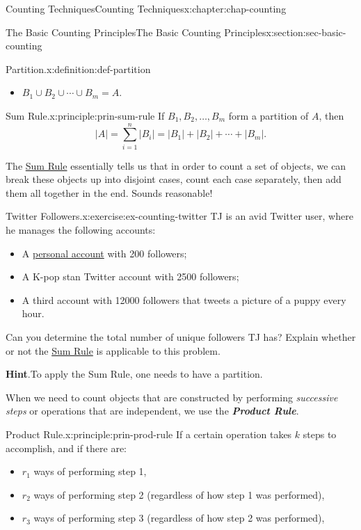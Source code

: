 \documentclass[oneside,10pt,]{book}
\newcommand{\blocktitlefont}{\relax}
\newcommand{\alert}[1]{\textbf{\textit{#1}}}
\numberwithin{equation}{section}
\begin{document}
\begin{chapterptx}{Counting Techniques}{}{Counting Techniques}{}{}{x:chapter:chap-counting}
\begin{sectionptx}{The Basic Counting Principles}{}{The Basic Counting Principles}{}{}{x:section:sec-basic-counting}
\begin{definition}{Partition.}{x:definition:def-partition}
\begin{itemize}[label=\textbullet]
\item{}\(B_1 \cup B_2 \cup \cdots \cup B_m = A\).%
\end{itemize}
%
\end{definition}
\begin{principle}{Sum Rule.}{}{x:principle:prin-sum-rule}%
If \(B_1,B_2,\ldots,B_m\) form a partition of \(A\), then%
\begin{equation*}
|A| = \sum_{i=1}^n |B_i| = |B_1| + |B_2| + \cdots + |B_m|\text{.}
\end{equation*}
%
\end{principle}
The \hyperref[x:principle:prin-sum-rule]{Sum Rule} essentially tells us that in order to count a set of objects, we can break these objects up into disjoint cases, count each case separately, then add them all together in the end. Sounds reasonable!%
\begin{inlineexercise}{Twitter Followers.}{x:exercise:ex-counting-twitter}%
TJ is an avid Twitter user, where he manages the following accounts:%
\begin{itemize}[label=\textbullet]
\item{}A \href{https://twitter.com/tjyusun}{personal account} with 200 followers;%
\item{}A K-pop stan Twitter account with 2500 followers;%
\item{}A third account with 12000 followers that tweets a picture of a puppy every hour.%
\end{itemize}
Can you determine the total number of unique followers TJ has? Explain whether or not the \hyperref[x:principle:prin-sum-rule]{Sum Rule} is applicable to this problem.%
\par\smallskip%
\noindent\textbf{\blocktitlefont Hint}.\hypertarget{g:hint:id441565}{}\quad{}To apply the Sum Rule, one needs to have a partition.%
\end{inlineexercise}
When we need to count objects that are constructed by performing \emph{successive steps} or operations that are independent, we use the \alert{Product Rule}.%
\begin{principle}{Product Rule.}{}{x:principle:prin-prod-rule}%
If a certain operation takes \(k\) steps to accomplish, and if there are:%
\begin{itemize}[label=\textbullet]
\item{}\(r_1\) ways of performing step 1,%
\item{}\(r_2\) ways of performing step 2 (regardless of how step 1 was performed),%
\item{}\(r_3\) ways of performing step 3 (regardless of how step 2 was performed),%

\end{itemize}
\end{principle}
\end{sectionptx}
\end{chapterptx}
\end{document}
